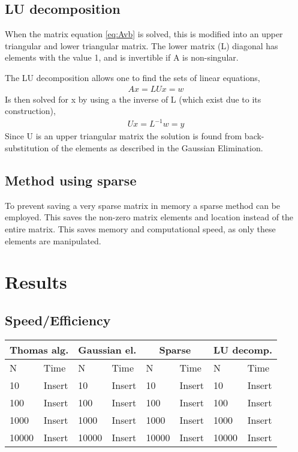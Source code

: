 \documentclass[11pt,a4paper,english,final]{article}
\numberwithin{equation}{section}
\begin{document}
\subsection{LU decomposition}

When the matrix equation \eqref{eq:Avb} is solved, this is modified into
an upper triangular and lower triangular matrix. The lower matrix (L) 
diagonal has elements with the value 1, and is invertible if A is 
non-singular.

The LU decomposition allows one to find the sets of linear equations,
\begin{gather}
Ax = LUx = w
\end{gather}
Is then solved for x by using a the inverse of L (which exist due to its 
construction), 
\begin{gather}
Ux = L^{-1}w = y
\end{gather}
Since U is an upper triangular matrix the solution is found from back-substitution
of the elements as described in the Gaussian Elimination.


\subsection{Method using sparse}

To prevent saving a very sparse matrix in memory a sparse method can be employed.
This saves the non-zero matrix elements and location instead of the 
entire matrix. This saves memory and computational speed, as only these
elements are manipulated.

\section{Results}

\subsection{Speed/Efficiency}

\begin{tabular}{|l|l|l|l|l|l|l|l|}
\hline
\multicolumn{2}{|c|}{Thomas alg.} & \multicolumn{2}{|c|}{Gaussian el.} & \multicolumn{2}{|c|}{Sparse} & \multicolumn{2}{|c|}{LU decomp.} \\
\hline
N & Time & N & Time & N & Time & N & Time  \\
\hline
10 & Insert & 10 & Insert & 10 & Insert &  10 & Insert \\
100 & Insert & 100 & Insert & 100 & Insert & 100 & Insert \\
1000 & Insert & 1000 & Insert & 1000 & Insert & 1000 & Insert \\
10000 & Insert & 10000 & Insert & 10000 & Insert & 10000 & Insert \\
\hline
\end{tabular}
\end{document}
